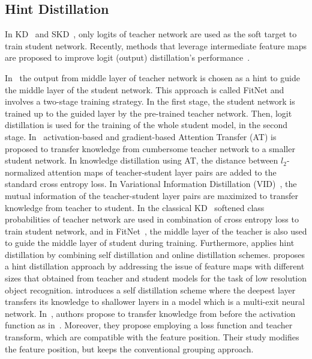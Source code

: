 \documentclass[final,3p,times]{elsarticle}
\begin{document}
\subsection{Hint Distillation}

In KD~\citep{hinton2015distilling} and SKD~\citep{guo2020spherical}, only logits of teacher network are used as the soft target to train student network. Recently, methods that leverage intermediate feature maps are proposed to improve logit (output) distillation's performance~{\citep{romero2015fitnets, ahn2019variational, ji2021show, li2022distilling, zhang2021student, wu2022single}}. 


In~\citep{romero2015fitnets} the output from middle layer of teacher network is chosen as a hint to guide the middle layer of the student network. This approach is called FitNet and involves a two-stage training strategy. 
{In the first stage, the student network is trained up to the guided layer by the pre-trained teacher network. Then, logit distillation is used for the training of the whole student model, in the second stage.}
In~\citep{Zagoruyko2017AT} activation-based and gradient-based Attention Transfer (AT) is proposed to transfer knowledge from cumbersome teacher network to a smaller student network. In knowledge distillation using AT, the distance between $l_2$-normalized attention maps of teacher-student layer pairs are added to the standard cross entropy loss. In Variational Information Distillation (VID)~\citep{ahn2019variational}, the mutual information of the teacher-student layer pairs are maximized to transfer knowledge from teacher to student. In the classical KD~\citep{hinton2015distilling} softened class probabilities of teacher network are used in combination of cross entropy loss to train student network, and in FitNet~\citep{romero2015fitnets}, the middle layer of the teacher is also used to guide the middle layer of student during training. Furthermore, \citep{li2022distilling} applies hint distillation by combining self distillation and online distillation schemes. \citep{huang2022feature} proposes a hint distillation approach by addressing the issue of feature maps with different sizes that obtained from teacher and student models for the task of low resolution object recognition.
\citep{zhang2021self} introduces a self distillation scheme where the deepest layer transfers its knowledge to shallower layers in a model which is a multi-exit neural network.
In~\citep{heo2019comprehensive}, authors propose to transfer knowledge from before the activation function as in~\citep{heo2019knowledge}. Moreover, they propose employing a loss function and teacher transform, which are compatible with the feature position. Their study modifies the feature position, but keeps the conventional grouping approach. 
\end{document}

